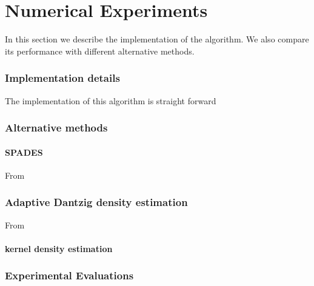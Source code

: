
\chapter{Numerical Experiments}

In this section we describe the implementation of the algorithm. We also compare its performance with different alternative methods.

\subsection{Implementation details}

The implementation of this algorithm is straight forward

\subsection{Alternative methods}
\subsubsection{SPADES}
From \cite{SPADES}
\subsection{Adaptive Dantzig density estimation}
From \cite{Bertin}
\subsubsection{kernel density estimation}

\subsection{Experimental Evaluations}